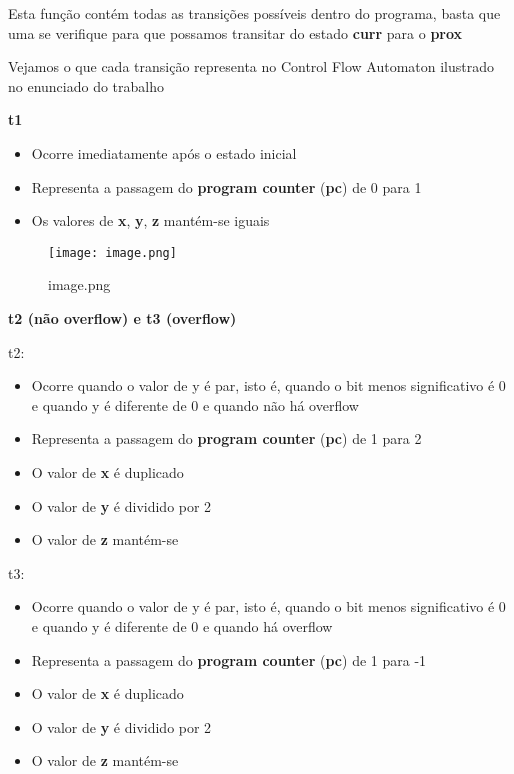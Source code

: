 \documentclass[11pt]{article}
\providecommand{\tightlist}{%
      \setlength{\itemsep}{0pt}\setlength{\parskip}{0pt}}
\begin{document}
Esta função contém todas as transições possíveis dentro do programa,
basta que uma se verifique para que possamos transitar do estado
\textbf{curr} para o \textbf{prox}

Vejamos o que cada transição representa no Control Flow Automaton
ilustrado no enunciado do trabalho

\hypertarget{t1}{%
\textbf{\Large t1}\label{t1}}

\begin{itemize}
\tightlist
\item
  Ocorre imediatamente após o estado inicial
\item
  Representa a passagem do \textbf{program counter} (\textbf{pc}) de 0
  para 1
\item
  Os valores de \textbf{x}, \textbf{y}, \textbf{z} mantém-se iguais
\end{itemize}

\begin{figure}
\centering
\texttt{[image: image.png]}
\caption{image.png}
\end{figure}

\hypertarget{t2-nuxe3o-overflow-e-t3-overflow}{%
\textbf{\Large t2 (não overflow) e t3
(overflow)}\label{t2-nuxe3o-overflow-e-t3-overflow}}

t2:

\begin{itemize}
\tightlist
\item
  Ocorre quando o valor de y é par, isto é, quando o bit menos
  significativo é 0 e quando y é diferente de 0 e quando não há overflow
\item
  Representa a passagem do \textbf{program counter} (\textbf{pc}) de 1
  para 2
\item
  O valor de \textbf{x} é duplicado
\item
  O valor de \textbf{y} é dividido por 2
\item
  O valor de \textbf{z} mantém-se
\end{itemize}

t3:

\begin{itemize}
\tightlist
\item
  Ocorre quando o valor de y é par, isto é, quando o bit menos
  significativo é 0 e quando y é diferente de 0 e quando há overflow
\item
  Representa a passagem do \textbf{program counter} (\textbf{pc}) de 1
  para -1
\item
  O valor de \textbf{x} é duplicado
\item
  O valor de \textbf{y} é dividido por 2
\item
  O valor de \textbf{z} mantém-se
\end{itemize}
\end{document}
